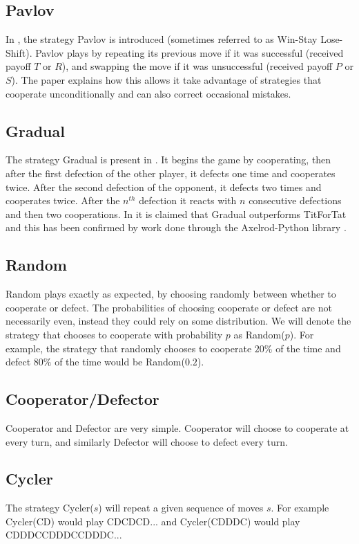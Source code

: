 \subsection{Pavlov}\label{ssec:strat_pavlov}
In \cite{Nowak1993}, the strategy Pavlov is introduced (sometimes referred to as Win-Stay Lose-Shift).
Pavlov plays by repeating its previous move if it was successful (received payoff $T$ or $R$), and swapping the move if it was unsuccessful (received payoff $P$ or $S$).
The paper explains how this allows it take advantage of strategies that cooperate unconditionally and can also correct occasional mistakes.

\subsection{Gradual}\label{ssec:strat_gradual}
The strategy Gradual is present in \cite{Beaufils1997}.
It begins the game by cooperating, then after the first defection of the other player, it defects one time and cooperates twice.
After the second defection of the opponent, it defects two times and cooperates twice.
After the $n^{th}$ defection it reacts with $n$ consecutive defections and then two cooperations.
In \cite{Beaufils1997} it is claimed that Gradual outperforms TitForTat and this has been confirmed by work done through the Axelrod-Python library \cite{Knight2016}.

\subsection{Random}\label{ssec:strat_random}
Random plays exactly as expected, by choosing randomly between whether to cooperate or defect.
The probabilities of choosing cooperate or defect are not necessarily even, instead they could rely on some distribution.
We will denote the strategy that chooses to cooperate with probability $p$ as Random($p$).
For example, the strategy that randomly chooses to cooperate $20\%$ of the time and defect $80\%$ of the time would be Random($0.2$).

\subsection{Cooperator/Defector}\label{ssec:strat_coop_defect}
Cooperator and Defector are very simple.
Cooperator will choose to cooperate at every turn, and similarly Defector will choose to defect every turn.

\subsection{Cycler}\label{ssec:strat_cycler}
The strategy Cycler($s$) will repeat a given sequence of moves $s$.
For example Cycler(CD) would play CDCDCD... and Cycler(CDDDC) would play CDDDCCDDDCCDDDC...

